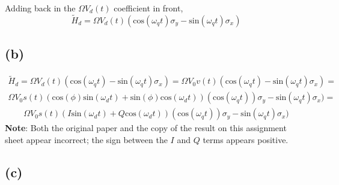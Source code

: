 \documentclass{article}
\begin{document}
Adding back in the $\Omega V_d(t)$ coefficient in front,
$$
\boxed{\tilde{H}_d=\Omega V_d(t)(\text{cos}(\omega_qt)\sigma_y-\text{sin}(\omega_qt)\sigma_x)}
$$

\subsection{(b)}

\begin{align*}
\tilde{H}_d=\Omega V_d(t)(\text{cos}(\omega_qt)-\text{sin}(\omega_qt)\sigma_x)=
\Omega V_0v(t)(\text{cos}(\omega_qt)-\text{sin}(\omega_qt)\sigma_x)=
\end{align*}
\begin{align*}
\Omega V_0s(t)(\text{cos}(\phi)\text{sin}(\omega_dt)+\text{sin}(\phi)\text{cos}(\omega_dt))(\text{cos}(\omega_qt))\sigma_y-\text{sin}(\omega_qt)\sigma_x)=
\end{align*}
\begin{align*}
\boxed{\Omega V_0s(t)(I\text{sin}(\omega_dt)+Q\text{cos}(\omega_dt))(\text{cos}(\omega_qt))\sigma_y-\text{sin}(\omega_qt)\sigma_x)}
\end{align*}
\textbf{Note}: Both the original paper and the copy of the result on this assignment sheet appear incorrect; the sign between the $I$ and $Q$ terms appears positive.

\subsection{(c)}
\end{document}
